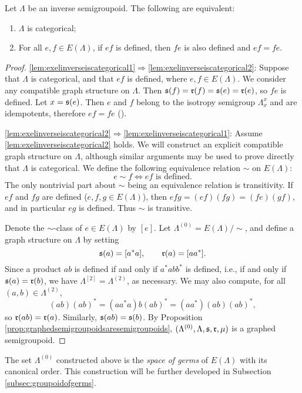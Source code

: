 \begin{lemma}\label{lem:exelinverseiscategorical}
Let $\Lambda$ be an inverse semigroupoid. The following are equivalent:
\begin{enumerate}[label=(\arabic*)]
\item\label{lem:exelinverseiscategorical1} $\Lambda$ is categorical;
\item\label{lem:exelinverseiscategorical2} For all $e,f\in E(\Lambda)$, if $ef$ is defined, then $fe$ is also defined and $ef=fe$.
\end{enumerate}
\end{lemma}
\begin{proof}
  \ref{lem:exelinverseiscategorical1}$\Rightarrow$\ref{lem:exelinverseiscategorical2}: Suppose that $\Lambda$ is categorical, and that $ef$ is defined, where $e,f\in E(\Lambda)$. We consider any compatible graph structure on $\Lambda$. Then $\operatorname{\mathfrak{s}}(f)=\operatorname{\mathfrak{r}}(f)=\operatorname{\mathfrak{s}}(e)=\operatorname{\mathfrak{r}}(e)$, so $fe$ is defined. Let $x=\operatorname{\mathfrak{s}}(e)$. Then $e$ and $f$ belong to the isotropy semigroup $\Lambda_x^x$ and are idempotents, therefore $ef=fe$ (\cite[Theorem 5.1.1]{MR1455373}).
  
  \ref{lem:exelinverseiscategorical2}$\Rightarrow$\ref{lem:exelinverseiscategorical1}: Assume \ref{lem:exelinverseiscategorical2} holds. We will construct an explicit compatible graph structure on $\Lambda$, although similar arguments may be used to prove directly that $\Lambda$ is categorical. We define the following equivalence relation $\sim$ on $E(\Lambda)$:
  \[e\sim f\iff ef\text{ is defined}.\]
  The only nontrivial part about $\sim$ being an equivalence relation is transitivity. If $ef$ and $fg$ are defined ($e,f,g\in E(\Lambda)$), then $efg=(ef)(fg)=(fe)(gf)$, and in particular $eg$ is defined. Thus $\sim$ is transitive.
  
  Denote the $\sim$-class of $e\in E(\Lambda)$ by $[e]$. Let $\Lambda^{(0)}=E(\Lambda)/\!\!\sim$, and define a graph structure on $\Lambda$ by setting
  \[\operatorname{\mathfrak{s}}(a)=[a^*a],\qquad \operatorname{\mathfrak{r}}(a)=[aa^*].\]
  Since a product $ab$ is defined if and only if $a^*abb^*$ is defined, i.e., if and only if $\operatorname{\mathfrak{s}}(a)=\operatorname{\mathfrak{r}}(b)$, we have $\Lambda^{[2]}=\Lambda^{(2)}$, as necessary. We may also compute, for all $(a,b)\in\Lambda^{(2)}$,
  \[(ab)(ab)^*=(aa^*a)b(ab)^*=(aa^*)(ab)(ab)^*,\]
  so $\operatorname{\mathfrak{r}}(ab)=\operatorname{\mathfrak{r}}(a)$. Similarly, $\operatorname{\mathfrak{s}}(ab)=\operatorname{\mathfrak{s}}(b)$. By Proposition \ref{prop:graphedsemigroupoidsaresemigroupoids}, $(\Lambda^{(0)},\Lambda,\operatorname{\mathfrak{s}},\operatorname{\mathfrak{r}},\mu)$ is a graphed semigroupoid.\qedhere
  \end{proof}

The set $\Lambda^{(0)}$ constructed above is the \emph{space of germs} of $E(\Lambda)$ with its canonical order. This construction will be further developed in Subsection \ref{subsec:groupoidofgerms}.

